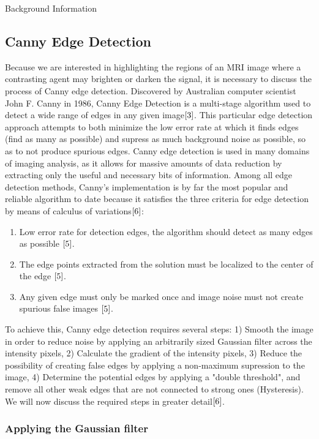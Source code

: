 \documentclass[a4paper,12pt]{article}
\begin{document}
\begin{section}{Background Information}
\subsection{Canny Edge Detection}

Because we are interested in highlighting the regions of an MRI image where a contrasting agent may brighten or darken the signal, it is necessary to discuss the process of Canny edge detection. Discovered by Australian computer scientist John F. Canny in 1986, Canny Edge Detection is a multi-stage algorithm used to detect a wide range of edges in any given image$\cite{3}$.%
This particular edge detection approach attempts to both minimize the low error rate at which it finds edges (find as many as possible) and supress as much background noise as possible, so as to not produce spurious edges. Canny edge detection is used in many domains of imaging analysis, as it allows for massive amounts of data reduction by extracting only the useful and necessary bits of information. Among all edge detection methods, Canny's implementation is by far the most popular and reliable algorithm to date because it satisfies the three criteria for edge detection by means of calculus of variations$\cite{6}$:\\%

\singlespacing
\begin{enumerate}
\item Low error rate for detection edges, the algorithm should detect as many edges as possible  $\cite{5}$.
\item The edge points extracted from the solution must be localized to the center of the edge  $\cite{5}$.
\item Any given edge must only be marked once and image noise must not create spurious false images  $\cite{5}$.
\end{enumerate}
\doublespacing

To achieve this, Canny edge detection requires several steps: 1) Smooth the image in order to reduce noise by applying an arbitrarily sized Gaussian filter across the intensity pixels, 2) Calculate the gradient of the intensity pixels, 3) Reduce the possibility of creating false edges by applying a non-maximum supression to the image, 4) Determine the potential edges by applying a "double threshold", and remove all other weak edges that are not connected to strong ones (Hysteresis). We will now discuss the required steps in greater detail$\cite{6}$.%

\subsubsection{Applying the Gaussian filter}


\end{section}
\end{document}
